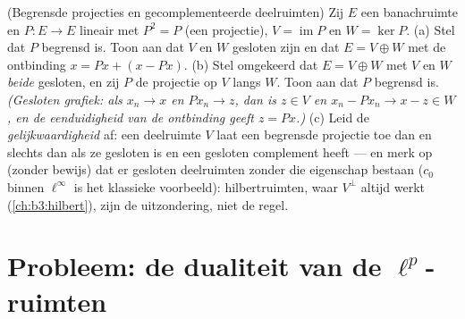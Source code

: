 \begin{exercise}[$\star\star$]\label{exo:b3:banach:12}
(Begrensde projecties en gecomplementeerde deelruimten) Zij $E$
een banachruimte en $P \colon E \to E$ lineair met $P^2 = P$ (een
 projectie), $V = \operatorname{im}P$ en $W = \ker
P$.
(a) Stel dat $P$ begrensd is. Toon aan dat $V$ en $W$ gesloten
zijn en dat $E = V \oplus W$ met de ontbinding $x = Px + (x -
Px)$.
(b) Stel omgekeerd dat $E = V \oplus W$ met $V$ en $W$
\emph{beide} gesloten, en zij $P$ de projectie op $V$ langs $W$.
Toon aan dat $P$ begrensd is. \emph{(Gesloten grafiek: als $x_n
\to x$ en $Px_n \to z$, dan is $z \in V$ en $x_n - Px_n \to x - z
\in W$, en de eenduidigheid van de ontbinding geeft $z = Px$.)}
(c) Leid de \emph{gelijkwaardigheid} af: een deelruimte $V$ laat
een begrensde projectie toe dan en slechts dan als ze gesloten is
en een gesloten  complement heeft --- en merk op
(zonder bewijs) dat er gesloten deelruimten zonder die eigenschap
bestaan ($c_0$ binnen $\ell^\infty$ is het klassieke voorbeeld):
hilbertruimten, waar $V^\perp$ altijd werkt
(\cref{ch:b3:hilbert}), zijn de uitzondering, niet de regel.
\end{exercise}

\section{Probleem: de dualiteit van de
\texorpdfstring{$\ell^p$}{lp}-ruimten}

